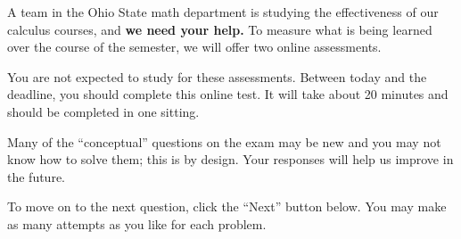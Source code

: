 \documentclass{ximera}
\begin{document}
A team in the Ohio State math department is studying the effectiveness
of our calculus courses, and \textbf{we need your help.}  To measure
what is being learned over the course of the semester, we will offer
two online assessments.

You are not expected to study for these assessments.  Between today
and the deadline, you should complete this online test.  It will take
about 20 minutes and should be completed in one sitting.

Many of the ``conceptual'' questions on the exam may be new and you
may not know how to solve them; this is by design.  Your responses
will help us improve in the future.

To move on to the next question, click the ``Next'' button below.  You
may make as many attempts as you like for each problem.
\end{document}
